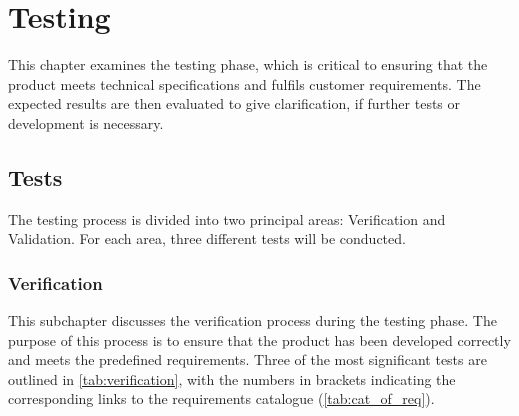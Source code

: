 \documentclass{article}
\begin{document}
\newpage
\section{Testing}
This chapter examines the testing phase, which is critical to ensuring that the product
meets technical specifications and fulfils customer requirements. The expected results
are then evaluated to give clarification, if further tests or development is necessary.

\subsection{Tests}
The testing process is divided into two principal areas: Verification and Validation.
For each area, three different tests will be conducted.

\subsubsection{Verification}
This subchapter discusses the verification process during the testing phase. The purpose of
this process is to ensure that the product has been developed correctly and meets the
predefined requirements.
Three of the most significant tests are outlined in \autoref{tab:verification}, with the
numbers in brackets indicating the corresponding links to the requirements catalogue (\autoref{tab:cat_of_req}).

\renewcommand{\arraystretch}{1.5}
\end{document}
